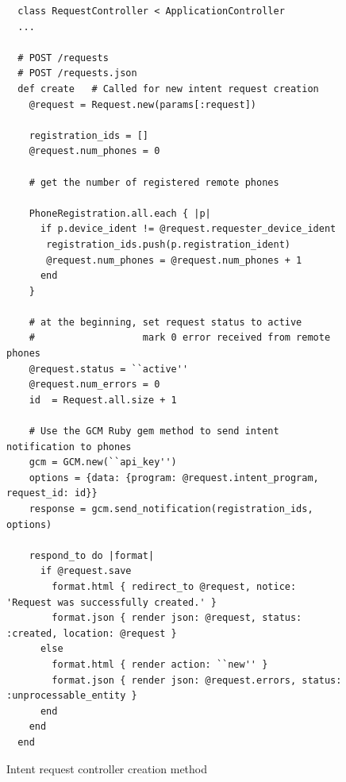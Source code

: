 \documentclass{acm_proc_article-sp}
\begin{document}
\begin{figure}
\begin{lstlisting}
  class RequestController < ApplicationController
  ...

  # POST /requests
  # POST /requests.json
  def create   # Called for new intent request creation
    @request = Request.new(params[:request])

    registration_ids = []
    @request.num_phones = 0

    # get the number of registered remote phones 

    PhoneRegistration.all.each { |p|
      if p.device_ident != @request.requester_device_ident
       registration_ids.push(p.registration_ident)
       @request.num_phones = @request.num_phones + 1
      end
    }

    # at the beginning, set request status to active
    #                   mark 0 error received from remote phones
    @request.status = ``active''
    @request.num_errors = 0
    id  = Request.all.size + 1

    # Use the GCM Ruby gem method to send intent notification to phones
    gcm = GCM.new(``api_key'')
    options = {data: {program: @request.intent_program, request_id: id}}
    response = gcm.send_notification(registration_ids, options)

    respond_to do |format|
      if @request.save
        format.html { redirect_to @request, notice: 'Request was successfully created.' }
        format.json { render json: @request, status: :created, location: @request }
      else
        format.html { render action: ``new'' }
        format.json { render json: @request.errors, status: :unprocessable_entity }
      end
    end
  end
\end{lstlisting}
\caption{Intent request controller creation method}
\label{fig:intent_request_controller_create}
\end{figure}
\end{document}
